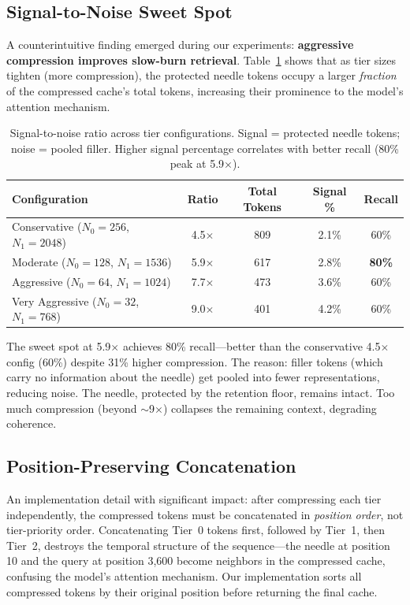 \documentclass[11pt]{article}
\begin{document}
\subsection{Signal-to-Noise Sweet Spot}

A counterintuitive finding emerged during our experiments: \textbf{aggressive compression improves slow-burn retrieval}. Table~\ref{tab:signal} shows that as tier sizes tighten (more compression), the protected needle tokens occupy a larger \textit{fraction} of the compressed cache's total tokens, increasing their prominence to the model's attention mechanism.

\begin{table}[ht]
\centering
\caption{Signal-to-noise ratio across tier configurations. Signal = protected needle tokens; noise = pooled filler. Higher signal percentage correlates with better recall (80\% peak at 5.9$\times$).}
\label{tab:signal}
\begin{tabular}{lcccc}
\toprule
\textbf{Configuration} & \textbf{Ratio} & \textbf{Total Tokens} & \textbf{Signal \%} & \textbf{Recall} \\
\midrule
Conservative ($N_0{=}256$, $N_1{=}2048$) & 4.5$\times$ & 809 & 2.1\% & 60\% \\
Moderate ($N_0{=}128$, $N_1{=}1536$) & 5.9$\times$ & 617 & 2.8\% & \textbf{80\%} \\
Aggressive ($N_0{=}64$, $N_1{=}1024$) & 7.7$\times$ & 473 & 3.6\% & 60\% \\
Very Aggressive ($N_0{=}32$, $N_1{=}768$) & 9.0$\times$ & 401 & 4.2\% & 60\% \\
\bottomrule
\end{tabular}
\end{table}

The sweet spot at 5.9$\times$ achieves 80\% recall---better than the conservative 4.5$\times$ config (60\%) despite 31\% higher compression. The reason: filler tokens (which carry no information about the needle) get pooled into fewer representations, reducing noise. The needle, protected by the retention floor, remains intact. Too much compression (beyond $\sim$9$\times$) collapses the remaining context, degrading coherence.

\subsection{Position-Preserving Concatenation}

An implementation detail with significant impact: after compressing each tier independently, the compressed tokens must be concatenated in \textit{position order}, not tier-priority order. Concatenating Tier~0 tokens first, followed by Tier~1, then Tier~2, destroys the temporal structure of the sequence---the needle at position 10 and the query at position 3,600 become neighbors in the compressed cache, confusing the model's attention mechanism. Our implementation sorts all compressed tokens by their original position before returning the final cache.
\end{document}
